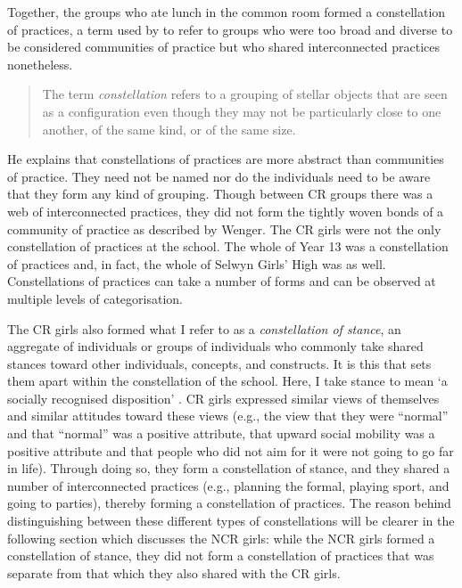 Together, the groups who ate lunch in the common room formed a constellation of practices, a term used by  to refer to groups who were too broad and diverse to be considered communities of practice but who shared interconnected practices nonetheless. 

\begin{quote}
The term \textit{constellation} refers to a grouping of stellar objects that are seen as a configuration even though they may not be particularly close to one another, of the same kind, or of the same size. \cite[127]{wenger1998} 
\end{quote}

\noindent He explains that constellations of practices are more abstract than communities of practice.   They need not be named nor do the individuals need to be aware that they form any kind of grouping.  Though between CR groups there was a web of interconnected practices, they did not form the tightly woven bonds of a community of practice as described by Wenger.  The CR girls were not the only constellation of practices at the school.  The whole of Year 13 was a constellation of practices and, in fact, the whole of Selwyn Girls' High was as well.  Constellations of practices can take a number of forms and can be observed at multiple levels of categorisation.

The CR girls also formed what I refer to as a \textit{constellation of stance}, an aggregate of individuals or groups of individuals who commonly take shared stances toward other individuals, concepts, and constructs. It is this that sets them apart within the constellation of the school.  Here, I take stance to mean `a socially recognised disposition' \cite[2]{ochs1990}.  CR girls expressed similar views of themselves and similar attitudes toward these views (e.g., the view that they were ``normal'' and that ``normal'' was a positive attribute, that upward social mobility was a positive attribute and that people who did not aim for it were not going to go far in life).  Through doing so, they form a constellation of stance, and they shared a number of interconnected practices (e.g., planning the formal, playing sport, and going to parties), thereby forming a constellation of practices.  The reason behind distinguishing between these different types of constellations will be clearer in the following section which discusses the NCR girls: while the NCR girls formed a constellation of stance, they did not form a constellation of practices that was separate from that which they also shared with the CR girls.

